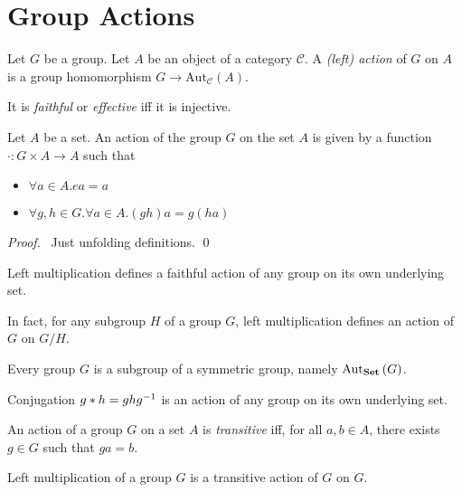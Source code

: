 \section{Group Actions}

\begin{df}[Action]
Let $G$ be a group. Let $A$ be an object of a category $\mathcal{C}$. A \emph{(left) action} of $G$ on $A$ is a group homomorphism $G \rightarrow \mathrm{Aut}_\mathcal{C}(A)$.

It is \emph{faithful} or \emph{effective} iff it is injective.
\end{df}

\begin{prop}
Let $A$ be a set. An action of the group $G$ on the set $A$ is given by a function $\cdot : G \times A \rightarrow A$ such that
\begin{itemize}
\item $\forall a \in A. ea = a$
\item $\forall g,h \in G. \forall a \in A. (gh)a = g(ha)$
\end{itemize}
\end{prop}

\begin{proof}
\pf\ Just unfolding definitions. \qed
\end{proof}

\begin{ex}
Left multiplication defines a faithful action of any group on its own underlying set.

In fact, for any subgroup $H$ of a group $G$, left multiplication defines an action of $G$ on $G/H$.
\end{ex}

\begin{cor}
Every group $G$ is a subgroup of a symmetric group, namely $\mathrm{Aut}_{\mathbf{Set}} \left( {G} \right)$.
\end{cor}

\begin{ex}
Conjugation $g * h = gh{g}^{-1}$ is an action of any group on its own underlying set.
\end{ex}

\begin{df}[Transitive]
An action of a group $G$ on a set $A$ is \emph{transitive} iff, for all $a,b \in A$, there exists $g \in G$ such that $ga = b$.
\end{df}

\begin{ex}
Left multiplication of a group $G$ is a transitive action of $G$ on $G$.
\end{ex}


